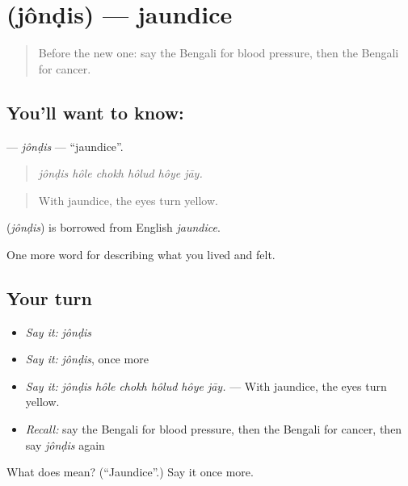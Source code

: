 \section[\texorpdfstring{\bn{জন্ডিস} (jônḍis)}{জন্ডিস (jônḍis)}]{ (jônḍis) — jaundice}

\label{lesson:BN-C474-jondis}



\begin{quote}
Before the new one: say the Bengali for blood pressure, then the Bengali for cancer.
\end{quote}

\subsection*{You'll want to know: }
\textbf{} — \emph{jônḍis} — \textquotedblleft{}jaundice\textquotedblright{}.

\begin{quote}
     
\end{quote}

\begin{quote}
\emph{jônḍis hôle chokh hôlud hôye jāy.}
\end{quote}

\begin{quote}
With jaundice, the eyes turn yellow.
\end{quote}

\begin{cousinweb}
\textbf{} (\emph{jônḍis}) is borrowed from English \emph{jaundice}.
\end{cousinweb}

\begin{grammarlens}[title={What you've built}]
One more word for describing what you lived and felt.
\end{grammarlens}

\subsection*{Your turn}
\begin{itemize}
\raggedright
  \item \emph{Say it:} \emph{jônḍis}
  \item \emph{Say it:} \emph{jônḍis}, once more
  \item \emph{Say it:} \emph{jônḍis hôle chokh hôlud hôye jāy.} — With jaundice, the eyes turn yellow.
  \item \emph{Recall:} say the Bengali for blood pressure, then the Bengali for cancer, then say \emph{jônḍis} again
\end{itemize}

\begin{tcolorbox}[breakable,colback=teal!4,colframe=teal!35!black,title={Before you move on}]
What does  mean? (\textquotedblleft{}Jaundice\textquotedblright{}.) Say it once more.
\end{tcolorbox}
